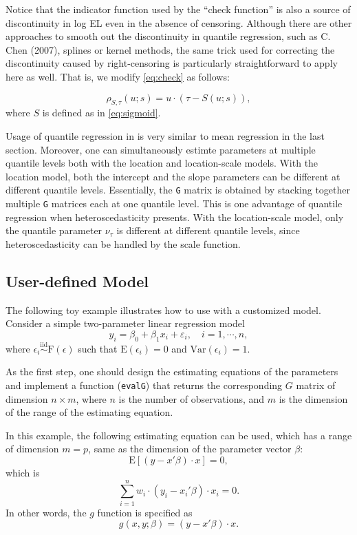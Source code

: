 \documentclass[article]{jss}
\renewcommand{\|}{\,|\,}
\begin{document}
Notice that the indicator function used by the ``check function'' is also a source of discontinuity in log EL even in the absence of censoring. Although there are other approaches to smooth out the discontinuity in quantile regression, such as C. Chen (2007), splines or kernel methods, the same trick used for correcting the discontinuity caused by right-censoring is particularly straightforward to apply here as well. That is, we modify \eqref{eq:check} as follows:

\begin{equation}
\rho_{S,\tau}(u;s) = u\cdot(\tau - S(u;s)),
\end{equation}
where \(S\) is defined as in \eqref{eq:sigmoid}.

Usage of quantile regression in  is very similar to mean regression in the last section. Moreover, one can simultaneously estimte parameters at multiple quantile levels both with the location and location-scale models. With the location model, both the intercept and the slope parameters can be different at different quantile levels. Essentially, the \texttt{G} matrix is obtained by stacking together multiple \texttt{G} matrices each at one quantile level. This is one advantage of quantile regression when heteroscedasticity presents. With the location-scale model, only the quantile parameter \(\nu_{\tau}\) is different at different quantile levels, since heteroscedasticity can be handled by the scale function.

\hypertarget{user-defined-model}{%
\subsection{User-defined Model}\label{user-defined-model}}

The following toy example illustrates how to use  with a customized model. Consider a simple two-parameter linear regression model
\[
  y_i = \beta_0 + \beta_1x_i + \varepsilon_i, \quad i=1,\cdots,n, 
\]
where \(\epsilon_i \stackrel {\textrm{iid}}{\sim}\text{F}(\epsilon)\) such that \(\textrm{E}(\epsilon_i) = 0\) and \(\text{Var}(\epsilon_i) = 1\).

As the first step, one should design the estimating equations of the parameters and implement a function (\texttt{evalG}) that returns the corresponding \(G\) matrix of dimension \(n\times m\), where \(n\) is the number of observations, and \(m\) is the dimension of the range of the estimating equation.

In this example, the following estimating equation can be used, which has a range of dimension \(m=p\), same as the dimension of the parameter vector \(\beta\):
\[
  \textrm{E}[(y-x'\beta)\cdot x] = 0,
\]
which is
\[
  \sum_{i=1}^n w_i\cdot (y_i-x_i'\beta)\cdot x_i = 0.
\]
In other words, the \(g\) function is specified as
\[
  g(x,y;\beta) = (y-x'\beta)\cdot x.
\]
\end{document}
